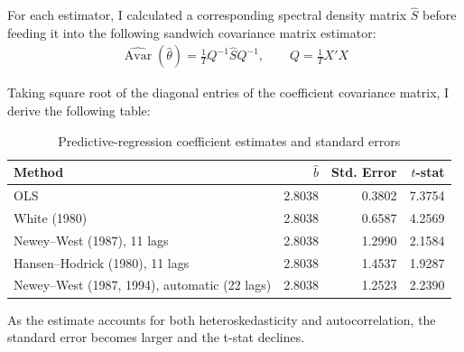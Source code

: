 \documentclass[11pt]{article}
\begin{document}
For each estimator, I calculated a corresponding spectral density matrix $\hat{S}$ before feeding it into the following sandwich covariance matrix estimator: 
\begin{align*}
\widehat{\operatorname{Avar}}(\hat{\theta})
= \frac{1}{T} 
Q^{-1}\widehat{S}Q^{-1}, 
\qquad Q= \frac{1}{T}X'X
\end{align*}

Taking square root of the diagonal entries of the coefficient covariance matrix, I derive the following table: 
\begin{table}[H]
  \centering
  \caption{Predictive-regression coefficient estimates and standard errors}
  \label{tab:q2b}
  \begin{tabular}{lrrr}
    \toprule
    Method & $\hat{b}$ & Std. Error & $t$-stat \\
    \midrule
    OLS & 2.8038 & 0.3802 & 7.3754 \\
    White (1980) & 2.8038 & 0.6587 & 4.2569 \\
    Newey--West (1987), 11 lags & 2.8038 & 1.2990 & 2.1584 \\
    Hansen--Hodrick (1980), 11 lags & 2.8038 & 1.4537 & 1.9287 \\
    Newey--West (1987, 1994), automatic (22 lags) & 2.8038 & 1.2523 & 2.2390 \\
    \bottomrule
  \end{tabular}
\end{table}

As the estimate accounts for both heteroskedasticity and autocorrelation, the standard error becomes larger and the t-stat declines. 
\end{document}
